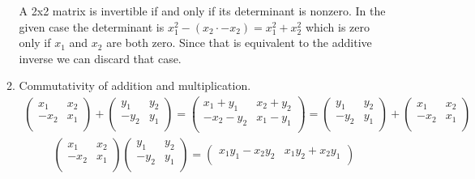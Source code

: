 \documentclass{article}
\begin{document}
\begin{enumerate}
\begin{enumerate}[label={(\roman*)}]
        A 2x2 matrix is invertible if and only if its determinant is nonzero. In the given case the determinant is $x_1^2 - (x_2 \cdot -x_2) = x_1^2 + x_2^2$ which is zero only if $x_1$ and $x_2$ are both zero. Since that is equivalent to the additive inverse we can discard that case.

        \item Commutativity of addition and multiplication.
        \begin{align*}
            \begin{pmatrix}
                x_1 & x_2 \\ -x_2 & x_1 \\
            \end{pmatrix} +
            \begin{pmatrix}
                y_1 & y_2 \\ -y_2 & y_1 \\
            \end{pmatrix} =
            \begin{pmatrix}
                x_1 + y_1 & x_2 + y_2 \\ -x_2 - y_2 & x_1 - y_1 \\
            \end{pmatrix} =
            \begin{pmatrix}
                y_1 & y_2 \\ -y_2 & y_1 \\
            \end{pmatrix} +
            \begin{pmatrix}
                x_1 & x_2 \\ -x_2 & x_1 \\
            \end{pmatrix}
        \end{align*}
        \begin{align*}
            \begin{pmatrix}
                x_1 & x_2 \\ -x_2 & x_1 \\
            \end{pmatrix}
            \begin{pmatrix}
                y_1 & y_2 \\ -y_2 & y_1 \\
            \end{pmatrix} =
            \begin{pmatrix}
                x_1y_1 - x_2y_2 & x_1y_2 + x_2y_1 \\

\end{pmatrix}
\end{align*}
\end{enumerate}
\end{enumerate}
\end{document}
